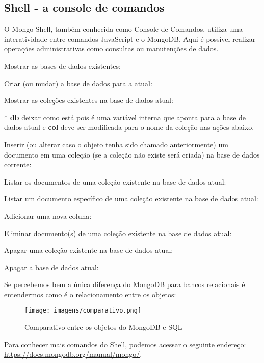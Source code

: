 \subsection{Shell - a console de comandos}
O Mongo Shell, também conhecida como Console de Comandos, utiliza uma interatividade entre comandos JavaScript e o MongoDB. Aqui é possível realizar operações administrativas como consultas ou manutenções de dados.

Mostrar as bases de dados existentes: \\

Criar (ou mudar) a base de dados para a atual: \\

Mostrar as coleções existentes na base de dados atual: \\

* \textbf{db} deixar como está pois é uma variável interna que aponta para a base de dados atual e \textbf{col} deve ser modificada para o nome da coleção nas ações abaixo.

Inserir (ou alterar caso o objeto tenha sido chamado anteriormente) um documento em uma coleção (se a coleção não existe será criada) na base de dados corrente: \\

Listar os documentos de uma coleção existente na base de dados atual: \\

Listar um documento específico de uma coleção existente na base de dados atual: \\

Adicionar uma nova coluna: \\

Eliminar documento(s) de uma coleção existente na base de dados atual: \\

Apagar uma coleção existente na base de dados atual: \\

Apagar a base de dados atual: \\

Se percebemos bem a única diferença do MongoDB para bancos relacionais é entendermos como é o relacionamento entre os objetos:
\begin{figure}[H]
	\centering
	\texttt{[image: imagens/comparativo.png]}
	\caption{Comparativo entre os objetos do MongoDB e SQL}
\end{figure}

Para conhecer mais comandos do Shell, podemos acessar o seguinte endereço: \url{https://docs.mongodb.org/manual/mongo/}.